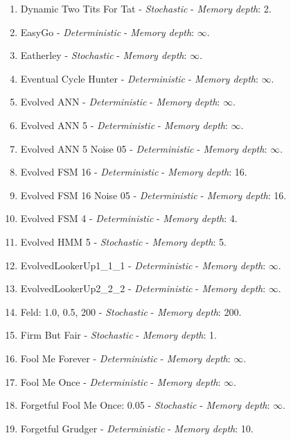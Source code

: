 \documentclass[10pt,letterpaper]{article}
\begin{document}
\begin{enumerate}
\item Dynamic Two Tits For Tat - \textit{Stochastic} - \textit{Memory depth}: 2. \cite{axelrodproject}
\item EasyGo - \textit{Deterministic} - \textit{Memory depth}: \(\infty\). \cite{Li2011, Prison1998}
\item Eatherley - \textit{Stochastic} - \textit{Memory depth}: \(\infty\). \cite{Axelrod1980b}
\item Eventual Cycle Hunter - \textit{Deterministic} - \textit{Memory depth}: \(\infty\). \cite{axelrodproject}
\item Evolved ANN - \textit{Deterministic} - \textit{Memory depth}: \(\infty\). \cite{axelrodproject}
\item Evolved ANN 5 - \textit{Deterministic} - \textit{Memory depth}: \(\infty\). \cite{axelrodproject}
\item Evolved ANN 5 Noise 05 - \textit{Deterministic} - \textit{Memory depth}: \(\infty\). \cite{axelrodproject}
\item Evolved FSM 16 - \textit{Deterministic} - \textit{Memory depth}: 16. \cite{axelrodproject}
\item Evolved FSM 16 Noise 05 - \textit{Deterministic} - \textit{Memory depth}: 16. \cite{axelrodproject}
\item Evolved FSM 4 - \textit{Deterministic} - \textit{Memory depth}: 4. \cite{axelrodproject}
\item Evolved HMM 5 - \textit{Stochastic} - \textit{Memory depth}: 5. \cite{axelrodproject}
\item EvolvedLookerUp1\_1\_1 - \textit{Deterministic} - \textit{Memory depth}: \(\infty\). \cite{axelrodproject}
\item EvolvedLookerUp2\_2\_2 - \textit{Deterministic} - \textit{Memory depth}: \(\infty\). \cite{axelrodproject}
\item Feld: 1.0, 0.5, 200 - \textit{Stochastic} - \textit{Memory depth}: 200. \cite{Axelrod1980}
\item Firm But Fair - \textit{Stochastic} - \textit{Memory depth}: 1. \cite{Frean1994}
\item Fool Me Forever - \textit{Deterministic} - \textit{Memory depth}: \(\infty\). \cite{axelrodproject}
\item Fool Me Once - \textit{Deterministic} - \textit{Memory depth}: \(\infty\). \cite{axelrodproject}
\item Forgetful Fool Me Once: 0.05 - \textit{Stochastic} - \textit{Memory depth}: \(\infty\). \cite{axelrodproject}
\item Forgetful Grudger - \textit{Deterministic} - \textit{Memory depth}: 10. \cite{axelrodproject}

\end{enumerate}
\end{document}
